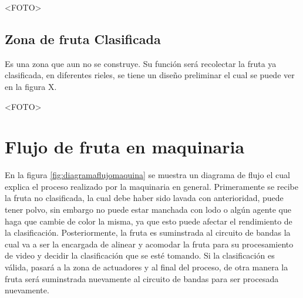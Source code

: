 \documentclass[twoside,spanish,ESP,MSc]{plantillaLabUPV}
\theoremstyle{definition}
\begin{document}
<FOTO>

\subsection{Zona de fruta Clasificada}
Es una zona que aun no se construye. Su función será recolectar la fruta ya clasificada, en diferentes rieles, se tiene un diseño preliminar el cual se puede ver en la figura X.


<FOTO>


\section{Flujo de fruta en maquinaria}

En la figura \ref{fig:diagramaflujomaquina} se muestra un diagrama de flujo el cual explica el proceso realizado por la maquinaria en general. Primeramente se recibe la fruta no clasificada, la cual debe haber sido lavada con anterioridad, puede tener polvo, sin embargo no puede estar manchada con lodo o algún agente que haga que cambie de color la misma, ya que esto puede afectar el rendimiento de la clasificación. Posteriormente, la fruta es suminstrada al circuito de bandas la cual va a ser la encargada de alinear y acomodar la fruta para su procesamiento de video y decidir la clasificación que se esté tomando. Si la clasificación es válida, pasará a la zona de actuadores y al final del proceso, de otra manera la fruta será suminstrada nuevamente al circuito de bandas para ser procesada nuevamente.
\end{document}
